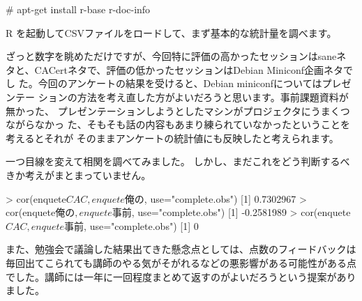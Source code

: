 \documentclass[mingoth,a4paper]{jsarticle}
\begin{document}
\begin{commandline}
# apt-get install r-base r-doc-info
\end{commandline}

R を起動してCSVファイルをロードして、まず基本的な統計量を調べます。


ざっと数字を眺めただけですが、今回特に評価の高かったセッションはsaneネ
タと、CACertネタで、評価の低かったセッションはDebian Miniconf企画ネタでし
た。今回のアンケートの結果を受けると、Debian miniconfについてはプレゼンテー
ションの方法を考え直した方がよいだろうと思います。事前課題資料が無かった、
プレゼンテーションしようとしたマシンがプロジェクタにうまくつながらなかっ
た、そもそも話の内容もあまり練られていなかったということを考えるとそれが
そのままアンケートの統計値にも反映したと考えられます。

一つ目線を変えて相関を調べてみました。
しかし、まだこれをどう判断するべきか考えがまとまっていません。

\begin{commandline}
> cor(enquete$CAC, enquete$俺の, use="complete.obs")
[1] 0.7302967
> cor(enquete$俺の, enquete$事前, use="complete.obs")
[1] -0.2581989
> cor(enquete$CAC, enquete$事前, use="complete.obs")
[1] 0
\end{commandline}

また、勉強会で議論した結果出てきた懸念点としては、点数のフィードバックは
毎回出てこられても講師のやる気がそがれるなどの悪影響がある可能性がある点
でした。講師には一年に一回程度まとめて返すのがよいだろうという提案があり
ました。
\end{document}
